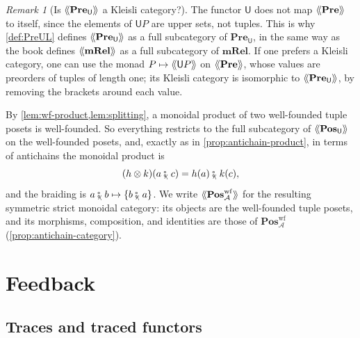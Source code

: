 \documentclass[11pt,a4paper]{article}
\theoremstyle{plain}
\theoremstyle{definition}
\theoremstyle{remark}
\newtheorem{remark}[theorem]{Remark}
\newcommand{\Cat}[1]{\mathbf{#1}}
\newcommand{\Pre}{\Cat{Pre}}
\newcommand{\Pos}{\Cat{Pos}}
\newcommand{\mRel}{\Cat{mRel}}
\newcommand{\U}{\mathsf{U}}
\newcommand{\An}{\mathcal{A}}
\newcommand{\PreU}{\Pre_{\U}}
\newcommand{\PosU}{\Pos_{\U}}
\newcommand{\PosA}{\Pos^{\mathrm{wf}}_{\An}}
\providecommand{\llangle}{\mathopen{\langle\mkern-3.5mu\langle}}
\providecommand{\rrangle}{\mathclose{\rangle\mkern-3.5mu\rangle}}
\newcommand{\tL}[1]{\llangle #1 \rrangle}
\newcommand{\tc}{\mathbin{\fatsemi_{\!\scriptscriptstyle\langle}}}
\begin{document}
\begin{remark}[Is $\tL{\PreU}$ a Kleisli category?]
    The functor $\U$ does not map $\tL{\Pre}$ to itself, since the elements of $\U P$ are upper sets, not tuples.
    This is why \cref{def:PreUL} defines $\tL{\PreU}$ as a full subcategory of $\PreU$, in the same way as the book defines $\tL{\mRel}$ as a full subcategory of $\mRel$.
    If one prefers a Kleisli category, one can use the monad $P \mapsto \tL{\U P}$ on $\tL{\Pre}$, whose values are preorders of tuples of length one; its Kleisli category is isomorphic to $\tL{\PreU}$, by removing the brackets around each value.
\end{remark}

By \cref{lem:wf-product,lem:splitting}, a monoidal product of two well-founded tuple posets is well-founded.
So everything restricts to the full subcategory of $\tL{\PosU}$ on the well-founded posets, and, exactly as in \cref{prop:antichain-product}, in terms of antichains the monoidal product is
\begin{equation}
    \label{eq:strict-antichain-product}
    (h \otimes k)(a \tc c) = h(a) \tc k(c),
\end{equation}
and the braiding is $a \tc b \mapsto \{ b \tc a \}$.
We write $\tL{\PosA}$ for the resulting symmetric strict monoidal category: its objects are the well-founded tuple posets, and its morphisms, composition, and identities are those of $\PosA$ (\cref{prop:antichain-category}).

\section{Feedback}
\label{sec:feedback}

\subsection{Traces and traced functors}
\end{document}
